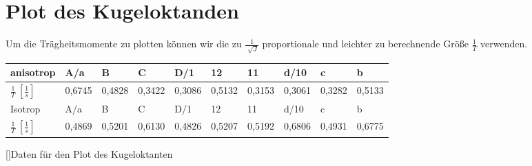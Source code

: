 \documentclass[12pt,a4paper,]{scrreprt}
\begin{document}
            \section{Plot des Kugeloktanden}
           Um die Trägheitsmomente zu plotten können wir die zu $\frac{1}{\sqrt[]{J}}$ proportionale und leichter zu berechnende Größe $\frac{1}{T}$ verwenden.\\
            \begin{tabular}{l|lllllllll}
anisotrop &A/a & B      & C      & D/1    & 12     & 11     & d/10   & c      & b       \\\hline
$\frac{1}{T} ~ [\frac{1}{s}]$ & 0,6745 & 0,4828 & 0,3422 & 0,3086 & 0,5132 & 0,3153 & 0,3061 & 0,3282 & 0,5133 \\ \hline \hline
Isotrop & A/a    & B      & C      & D/1    & 12     & 11     & d/10   & c      & b      \\ \hline
$\frac{1}{T} ~ [\frac{1}{s}]$& 0,4869 & 0,5201 & 0,6130 & 0,4826 & 0,5207 & 0,5192 & 0,6806 & 0,4931 & 0,6775
\end{tabular}
	[]{Daten für den Plot des Kugeloktanten}
\end{document}
